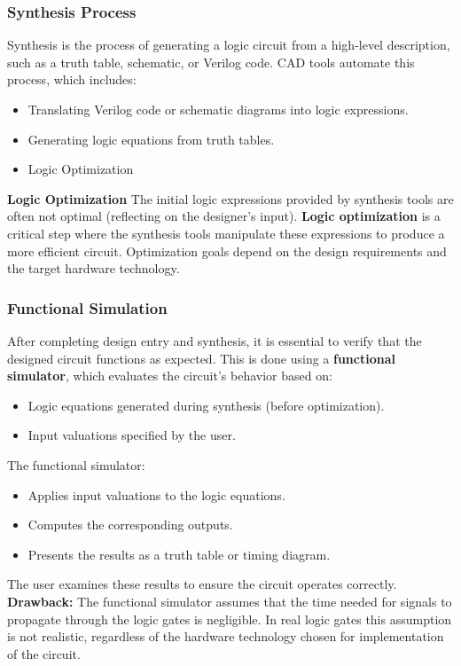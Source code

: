 \documentclass{article}
\begin{document}
      \subsubsection{Synthesis Process}
      Synthesis is the process of generating a logic circuit from a high-level description, such as a truth table, schematic, or Verilog code. CAD tools automate this process, which includes:
      \begin{itemize}
        \item Translating Verilog code or schematic diagrams into logic expressions.
        \item Generating logic equations from truth tables.
        \item Logic Optimization
      \end{itemize}

      \textbf{Logic Optimization}\newline
      The initial logic expressions provided by synthesis tools are often not optimal (reflecting on the designer's input). \textbf{Logic optimization} is a critical step where the synthesis tools manipulate these expressions to produce a more efficient circuit. Optimization goals depend on the design requirements and the target hardware technology. 

\subsubsection{Functional Simulation}
      After completing design entry and synthesis, it is essential to verify that the designed circuit functions as expected. This is done using a \textbf{functional simulator}, which evaluates the circuit's behavior based on:
      \begin{itemize}
        \item Logic equations generated during synthesis (before optimization).
        \item Input valuations specified by the user.
      \end{itemize}
      The functional simulator:
      \begin{itemize}
        \item Applies input valuations to the logic equations.
        \item Computes the corresponding outputs.
        \item Presents the results as a truth table or timing diagram.
      \end{itemize}
      The user examines these results to ensure the circuit operates correctly.
      \textbf{Drawback: }The functional simulator assumes that the time needed for signals to propagate through the logic gates is negligible. In real logic gates this assumption is not realistic, regardless of the hardware technology chosen for implementation of the circuit.
\end{document}

